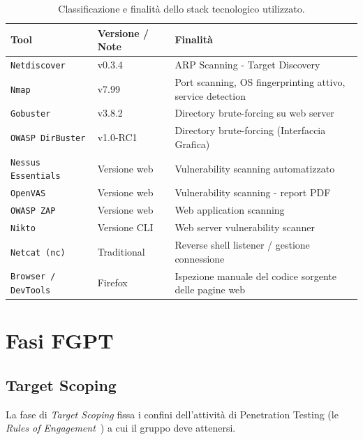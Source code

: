 \documentclass[11pt]{report}
\begin{document}
	\vspace{0.3cm}
	\begin{table}[H]
		\centering
		\renewcommand{\arraystretch}{1.3}
		\begin{tabular}{l p{4.5cm} p{8.5cm}}
			\toprule
			\textbf{Tool} & \textbf{Versione / Note} & \textbf{Finalità} \\
			\midrule
			\texttt{Netdiscover} & v0.3.4 & ARP Scanning - Target Discovery \\
			\texttt{Nmap}        & v7.99 & Port scanning, OS fingerprinting attivo, service detection \\
			\texttt{Gobuster}    & v3.8.2 & Directory brute-forcing su web server \\
			\texttt{OWASP DirBuster} & v1.0-RC1 & Directory brute-forcing (Interfaccia Grafica) \\
			\texttt{Nessus Essentials} & Versione web & Vulnerability scanning automatizzato \\
			\texttt{OpenVAS}     & Versione web & Vulnerability scanning - report PDF \\
			\texttt{OWASP ZAP}   & Versione web & Web application scanning \\
			\texttt{Nikto}       & Versione CLI & Web server vulnerability scanner \\
			\texttt{Netcat (nc)} & Traditional & Reverse shell listener / gestione connessione \\
			\texttt{Browser / DevTools} & Firefox & Ispezione manuale del codice sorgente delle pagine web \\
			\bottomrule
		\end{tabular}
		\caption{Classificazione e finalità dello stack tecnologico utilizzato.}
		\label{tab:tools_mapping}
	\end{table}
	\vspace{0.3cm}
	
	
	\chapter{Fasi FGPT}
	\section{Target Scoping}
	La fase di \textit{Target Scoping} fissa  i confini dell'attività di Penetration Testing (le \textit{Rules of Engagement}~\cite{ptes}) a cui il gruppo deve attenersi. 
	
\end{document}
